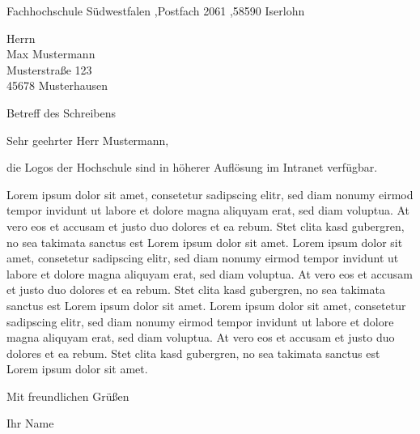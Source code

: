\documentclass[a4paper, 10pt, parskip=off, headheight=25mm, footheight=25mm]{scrartcl}
\newcommand{\name}{Ihr Name}
\newcommand{\postfach}{Fachhochschule Südwestfalen \sep Postfach 2061 \sep 58590 Iserlohn}
\begin{document}
\begin{anschreiben}

\begin{absender}
\postfach
\end{absender}

\begin{empfaenger}
Herrn \\ Max Mustermann \\ Musterstraße 123 \\ 45678 Musterhausen 
\end{empfaenger}

\begin{betreff}
Betreff des Schreibens
\end{betreff}

\begin{text}
Sehr geehrter Herr Mustermann, 

die Logos der Hochschule sind in höherer Auflösung im Intranet verfügbar.

Lorem ipsum dolor sit amet, consetetur sadipscing elitr, sed diam nonumy eirmod tempor invidunt ut labore et dolore magna aliquyam erat, sed diam voluptua. At vero eos et accusam et justo duo dolores et ea rebum. Stet clita kasd gubergren, no sea takimata sanctus est Lorem ipsum dolor sit amet. Lorem ipsum dolor sit amet, consetetur sadipscing elitr, sed diam nonumy eirmod tempor invidunt ut labore et dolore magna aliquyam erat, sed diam voluptua. At vero eos et accusam et justo duo dolores et ea rebum. Stet clita kasd gubergren, no sea takimata sanctus est Lorem ipsum dolor sit amet. Lorem ipsum dolor sit amet, consetetur sadipscing elitr, sed diam nonumy eirmod tempor invidunt ut labore et dolore magna aliquyam erat, sed diam voluptua. At vero eos et accusam et justo duo dolores et ea rebum. Stet clita kasd gubergren, no sea takimata sanctus est Lorem ipsum dolor sit amet.

Mit freundlichen Grüßen
\end{text}

\vspace{10mm}
\Titel\name

\end{anschreiben}
\end{document}

